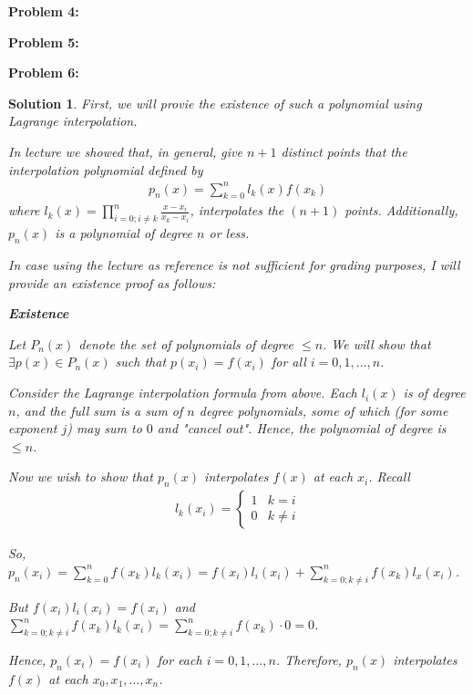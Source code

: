 \documentclass[12pt, letterpaper]{article}
\theoremstyle{nonumberplain}
\newtheorem{sol}{Solution}
\begin{document}
\newpage
\hspace{18pt}\textbf{Problem 4:} \medskip


\hspace{18pt}\textbf{Problem 5:} \medskip


\newpage

\hspace{18pt}\textbf{Problem 6:} \medskip
\begin{sol}
	First, we will provie the existence of such a polynomial using Lagrange interpolation.

	In lecture we showed that, in general, give $n+1$ distinct points that the interpolation polynomial defined by
	\begin{gather*}
		p_n(x) = \sum_{k=0}^n l_k(x) f(x_k)
	\end{gather*}
	where $l_k(x) = \prod_{i=0; i\neq k}^n \frac{x - x_i}{x_k - x_i}$, interpolates the $(n+1)$ points. Additionally, $p_n(x)$ is a polynomial of degree $n$ or less.

	In case using the lecture as reference is not sufficient for grading purposes, I will provide an existence proof as follows:

	\textbf{Existence}

	Let $P_n(x)$ denote the set of polynomials of degree $\leq n$. We will show that $\exists p(x) \in P_n(x)$ such that $p(x_i) = f(x_i)$ for all $i = 0, 1, \ldots, n$.

	Consider the Lagrange interpolation formula from above. Each $l_i(x)$ is of degree $n$, and the full sum is a sum of $n$ degree polynomials, some of which (for some exponent $j$) may sum to $0$ and "cancel out". Hence, the polynomial of degree is $\leq n$.

	Now we wish to show that $p_n(x)$ interpolates $f(x)$ at each $x_i$. Recall
	\begin{gather*}
		l_k(x_i) =
		\begin{cases}
			1 & k = i    \\
			0 & k \neq i
		\end{cases}
	\end{gather*}

	So, $p_n(x_i) = \sum_{k=0}^n f(x_k)l_k(x_i) = f(x_i)l_i(x_i) + \sum_{k=0;k\neq i}^n f(x_k)l_x(x_i)$.

	But $f(x_i)l_i(x_i) = f(x_i)$ and $\sum_{k=0;k\neq i}^n f(x_k)l_k(x_i) = \sum_{k=0;k\neq i}^n f(x_k)\cdot 0 = 0$.

	Hence, $p_n(x_i) = f(x_i)$ for each $i = 0, 1, \ldots, n$. Therefore, $p_n(x)$ interpolates $f(x)$ at each $x_0, x_1, \ldots, x_n$.


\end{sol}
\end{document}
